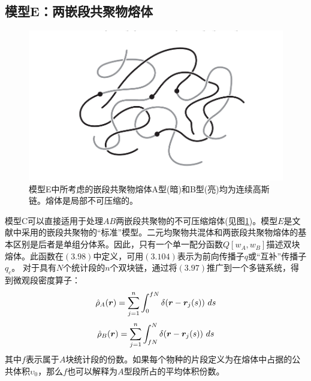\subsection{模型E：两嵌段共聚物熔体}

\begin{figure}[H]
	\centering   
	\includegraphics[width=12cm]{Contents/chapter4/figures/2.png}
	\caption{模型E中所考虑的嵌段共聚物熔体A型(暗)和B型(亮)均为连续高斯链。熔体是局部不可压缩的。}
	\label{模型E}
\end{figure}
模型C可以直接适用于处理$AB$两嵌段共聚物的不可压缩熔体(见图\ref{模型E})。模型$E$是文献中采用的嵌段共聚物的“标准”模型。二元均聚物共混体和两嵌段共聚物熔体的基本区别是后者是单组分体系。因此，只有一个单一配分函数$Q[w_{A},w_{B}]$描述双块熔体。此函数在$(3.98)$中定义，可用$(3.104)$表示为前向传播子$q$或“互补”传播子$q_{c}$。 对于具有$N$个统计段的$n$个双块链，通过将$(3.97)$推广到一个多链系统，得到微观段密度算子：\\
\begin{equation}
\hat{ \rho }_{A}(\bm{r})=\sum_{j=1}^{n} \int _{0}^{fN}  \delta (\bm{r}-\bm{r}_{j}(s))~d s
\end{equation}
\begin{equation}
\hat{ \rho }_{B}(\bm{r})=\sum_{j=1}^{n} \int _{fN}^{N} \delta (\bm{r}-\bm{r}_{j}(s))~d s 
\end{equation}
其中$f$表示属于$A$块统计段的份数。如果每个物种的片段定义为在熔体中占据的公共体积$\upsilon_0$，那么$f$也可以解释为$A$型段所占的平均体积份数。\\

